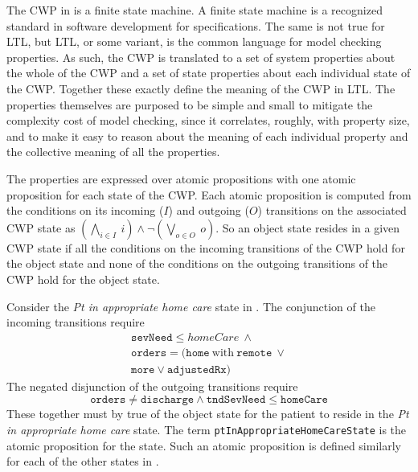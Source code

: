 The CWP in  is a finite state machine.
A finite state machine is a recognized standard in software development for specifications.
The same is not true for LTL, but LTL, or some variant, is the common language for model checking properties.
As such, the CWP is translated to a set of system properties about the whole of the CWP and a set of state properties about each individual state of the CWP.
Together these exactly define the meaning of the CWP in LTL.
The properties themselves are purposed to be simple and small to mitigate the complexity cost of model checking, since it correlates, roughly, with property size, and to make it easy to reason about the meaning of each individual property and the collective meaning of all the properties. 

The properties are expressed over atomic propositions with one atomic proposition for each state of the CWP.
Each atomic proposition is computed from the conditions on its incoming ($I$) and outgoing ($O$) transitions on the associated CWP state as $(\bigwedge_{i \in I}\ i) \wedge \neg(\bigvee_{o \in O}\ o)$.
So an object state resides in a given CWP state if all the conditions on the incoming transitions of the CWP hold for the object state and none of the conditions on the outgoing transitions of the CWP hold for the object state.

Consider the \emph{Pt in appropriate home care} state in . The conjunction of the incoming transitions require
%
\[
\begin{array}{l}
  \mathtt{sevNeed} \le homeCare\ \wedge\ \\
  \mathtt{orders} = (\mathtt{home}\ \mathrm{with}\ \mathtt{remote}\ \vee \\
                    \mathtt{more} \vee \mathtt{adjustedRx})
\end{array}
\]
%
The negated disjunction of the outgoing transitions require
%
\[
  \mathtt{orders} \neq \mathtt{discharge} \wedge \mathtt{tndSevNeed} \le \mathtt{homeCare}
\]
%
\noindent These together must by true of the object state for the patient to reside in the \emph{Pt in appropriate home care} state.
The term \texttt{ptInAppropriateHomeCareState} is the atomic proposition for the state.
Such an atomic proposition is defined similarly for each of the other states in .

